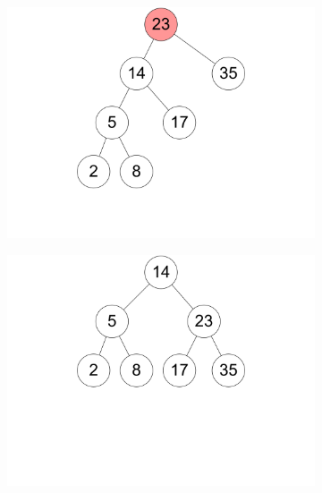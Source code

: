 \documentclass[11pt,a4paper]{article}
\begin{document}
\begin{loesung}
\begin{enumerate}
\begin{figure}[h!]
\begin{subfigure}[b]{0.23\textwidth}
                \includegraphics[width=\textwidth]{img/3a_19}
                \caption*{}
            \end{subfigure}
            \begin{subfigure}[b]{0.23\textwidth}
                \centering
                \includegraphics[width=\textwidth]{img/3a_20}
                \caption*{}
            \end{subfigure}
        \end{figure}
        \FloatBarrier


\end{enumerate}
\end{loesung}
\end{document}

